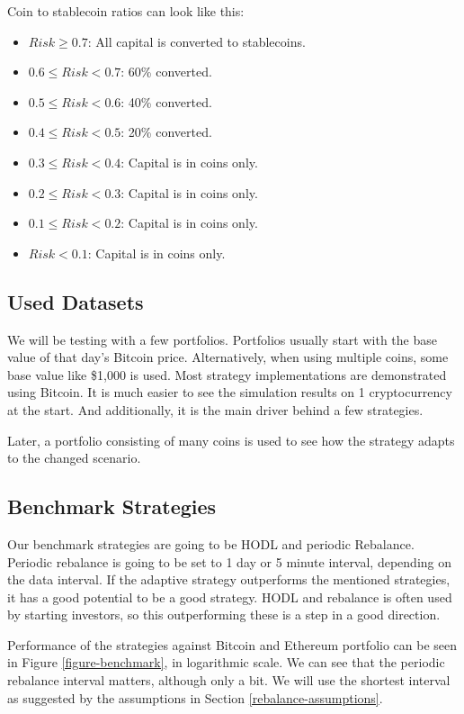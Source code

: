 Coin to stablecoin ratios can look like this:
\begin{itemize}
    \item $Risk \ge  0.7$: All capital is converted to stablecoins.
    \item $0.6 \le Risk < 0.7$: 60\% converted.
    \item $0.5 \le Risk < 0.6$: 40\% converted.
    \item $0.4 \le Risk < 0.5$: 20\% converted.
    \item $0.3 \le Risk < 0.4$: Capital is in coins only.
    \item $0.2 \le Risk < 0.3$: Capital is in coins only.
    \item $0.1 \le Risk < 0.2$: Capital is in coins only.
    \item $Risk < 0.1$: Capital is in coins only.
\end{itemize}


\subsection*{Used Datasets}
We will be testing with a few portfolios. Portfolios usually start with the base value of that day's Bitcoin price. Alternatively, when using multiple coins, some base value like \$1,000 is used. Most strategy implementations are demonstrated using Bitcoin. It is much easier to see the simulation results on 1 cryptocurrency at the start. And additionally, it is the main driver behind a few strategies.

Later, a portfolio consisting of many coins is used to see how the strategy adapts to the changed scenario.


\subsection*{Benchmark Strategies}
Our benchmark strategies are going to be HODL and periodic Rebalance. Periodic rebalance is going to be set to 1 day or 5 minute interval, depending on the data interval. If the adaptive strategy outperforms the mentioned strategies, it has a good potential to be a good strategy. HODL and rebalance is often used by starting investors, so this outperforming these is a step in a good direction.

Performance of the strategies against Bitcoin and Ethereum portfolio can be seen in Figure \ref{figure-benchmark}, in logarithmic scale. We can see that the periodic rebalance interval matters, although only a bit. We will use the shortest interval as suggested by the assumptions in Section \ref{rebalance-assumptions}.


